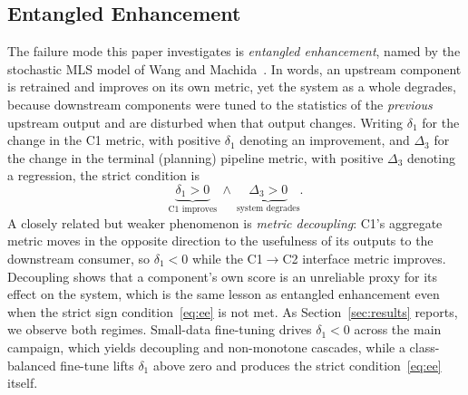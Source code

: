 \documentclass[conference]{IEEEtran}
\begin{document}
\subsection{Entangled Enhancement}
\label{sec:ee-def}
The failure mode this paper investigates is \emph{entangled enhancement}, named
by the stochastic MLS model of Wang and Machida~\cite{wang2024compsac}. In
words, an upstream component is retrained and improves on its own metric, yet
the system as a whole degrades, because downstream components were tuned to the
statistics of the \emph{previous} upstream output and are disturbed when that
output changes. Writing $\delta_1$ for the change in the C1 metric, with
positive $\delta_1$ denoting an improvement, and $\Delta_3$ for the change in
the terminal (planning) pipeline metric, with positive $\Delta_3$ denoting a
regression, the strict condition is
\begin{equation}
\underbrace{\delta_1 > 0}_{\text{C1 improves}}
\ \wedge\
\underbrace{\Delta_3 > 0}_{\text{system degrades}} .
\label{eq:ee}
\end{equation}
A closely related but weaker phenomenon is \emph{metric decoupling}: C1's
aggregate metric moves in the opposite direction to the usefulness of its
outputs to the downstream consumer, so $\delta_1 < 0$ while the C1$\to$C2
interface metric improves. Decoupling shows that a component's own score is an
unreliable proxy for its effect on the system, which is the same lesson as
entangled enhancement even when the strict sign condition~\eqref{eq:ee} is not
met. As Section~\ref{sec:results} reports, we observe both regimes. Small-data
fine-tuning drives $\delta_1 < 0$ across the main campaign, which yields
decoupling and non-monotone cascades, while a class-balanced fine-tune lifts
$\delta_1$ above zero and produces the strict condition~\eqref{eq:ee} itself.
\end{document}
